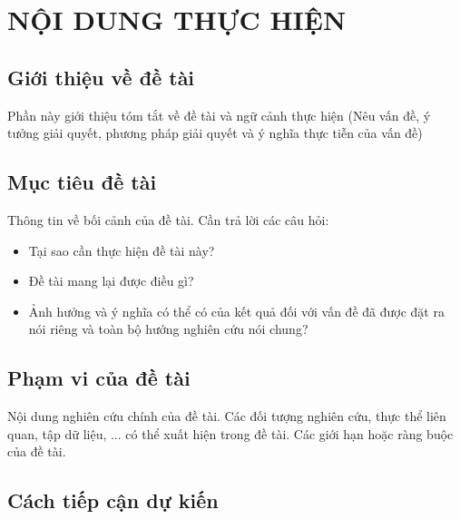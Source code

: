 \documentclass{article}[14pt]
\begin{document}
    \section{NỘI DUNG THỰC HIỆN}
    {

    
    \subsection{Giới thiệu về đề tài}
    
    Phần này giới thiệu tóm tắt về đề tài và ngữ cảnh thực hiện (Nêu vấn đề, ý tưởng giải quyết, phương pháp giải quyết và ý nghĩa thực tiễn của vấn đề)
    
    
    \subsection{Mục tiêu đề tài}
    
    Thông tin về bối cảnh của đề tài. Cần trả lời các câu hỏi:
    \begin{itemize}
        \item Tại sao cần thực hiện đề tài này?
        \item Đề tài mang lại được điều gì?
        \item Ảnh hưởng và ý nghĩa có thể có của kết quả đối với vấn đề đã được đặt ra nói riêng và toàn bộ hướng nghiên cứu nói chung?
    \end{itemize}
    
    \subsection{Phạm vi của đề tài}
    
    Nội dung nghiên cứu chính của đề tài. Các đối tượng nghiên cứu, thực thể liên quan, tập dữ liệu, ... có thể xuất hiện trong đề tài. Các giới hạn hoặc ràng buộc của đề tài. 
    
    \subsection{Cách tiếp cận dự kiến}
    
}
\end{document}
